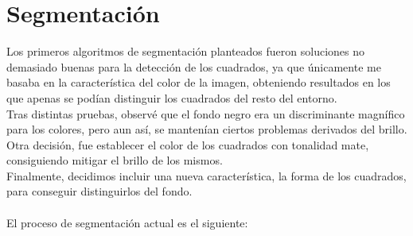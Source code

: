 \documentclass[11pt]{article}
\begin{document}
\section{Segmentación}
Los primeros algoritmos de segmentación planteados fueron soluciones no demasiado buenas para la detección de los cuadrados, ya que únicamente me basaba en la característica del color de la imagen, obteniendo resultados en los que apenas se podían distinguir los cuadrados del resto del entorno.\\
Tras distintas pruebas, observé que el fondo negro era un discriminante magnífico para los colores, pero aun así, se mantenían ciertos problemas derivados del brillo.\\
Otra decisión, fue establecer el color de los cuadrados con tonalidad mate, consiguiendo mitigar el brillo de los mismos.\\
Finalmente, decidimos incluir una nueva característica, la forma de los cuadrados, para conseguir distinguirlos del fondo.\\\\
El proceso de segmentación actual es el siguiente:
\end{document}
